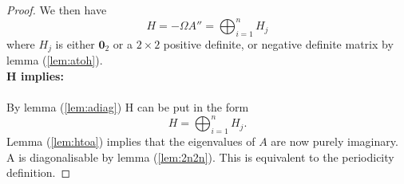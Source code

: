 \begin{proof}
We then have
\begin{equation}
H = -\Omega A'' = \bigoplus_{i=1}^n H_j
\end{equation}
where $H_j$ is either $\mathbf{0}_2$ or a $2\times 2$ positive definite, or negative definite matrix by lemma (\ref{lem:atoh}).\\

\textbf{H implies:} \\\\
By lemma (\ref{lem:adiag}) H can be put in the form 
\begin{equation}
H = \bigoplus_{i=1}^n H_j.
\end{equation}
Lemma (\ref{lem:htoa}) implies that the eigenvalues of $A$ are now purely imaginary. A is diagonalisable by lemma (\ref{lem:2n2n}). This is equivalent to the periodicity definition.
\end{proof}


